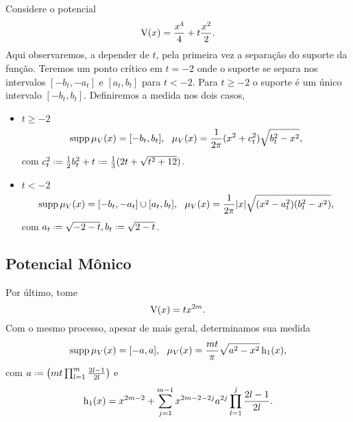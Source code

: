 Considere o potencial $$\operatorname{V}(x) = \frac{x^4}{4} + t \frac{x^2}{2}.$$ Aqui observaremos, a depender de $t$, pela primeira vez a separação do suporte da função. Teremos um ponto crítico em $t=-2$ onde o suporte se separa nos intervalos $[-b_t, -a_t]$ e $[a_t, b_t]$ para $t < -2$. Para $t \geq -2$ o suporte é um único intervalo $[-b_t, b_t]$. Definiremos a medida nos dois casos,
\begin{itemize}
	\item \(t \geq -2\)
	\begin{equation}
	\operatorname{supp} \mu_V(x) = [-b_t, b_t], \ \ \mu_V(x) = \frac{1}{2\pi} (x^2 + c_t^2) \sqrt{b_t^2 - x^2},\label{Equação: Quartico +}
	\end{equation}
	com $c_t^2 \deff\frac{1}{2} b_t^2 + t \deff \frac{1}{3} (2t + \sqrt{t^2 + 12})$.
	\item \(t < -2\)
	\begin{equation}
	\operatorname{supp} \mu_V(x) = [-b_t, -a_t] \cup [a_t, b_t], \ \ \mu_V(x) = \frac{1}{2\pi} |x| \sqrt{(x^2 - a_t^2)(b_t^2 - x^2)},
	\label{Equação: Quartico -}
	\end{equation}
	com $ a_t \deff \sqrt{-2-t}, b_t \deff \sqrt{2-t}$.
\end{itemize}





\subsection{Potencial Mônico}
 
 Por último, tome $$\operatorname{V}(x) = t x^{2m}.$$ Com o mesmo processo, apesar de mais geral, determinamos sua medida 
 \begin{equation}
 	\operatorname{supp} \mu_V(x) = [-a, a], \ \ \mu_V(x) = \frac{mt}{\pi} \sqrt{a^2 - x^2} \operatorname{h_1}(x),
 	\label{Equação: Mônico}
 \end{equation}
com $ a \deff \left( mt \prod_{l=1}^{m} \frac{2l-1}{2l}\right)$ e $$\operatorname{h_1}(x) = x^{2m-2} + \sum_{j=1}^{m-1} x^{2m-2-2j} a^{2j} \prod_{l=1}^{j} \frac{2l-1}{2l}.$$

